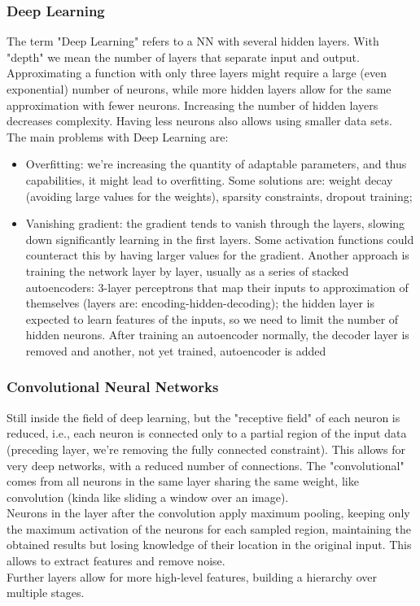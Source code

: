 \subsubsection{Deep Learning}
The term "Deep Learning" refers to a NN with several hidden layers. With "depth" we mean the number of layers that separate input and output. \\
Approximating a function with only three layers might require a large (even exponential) number of neurons, while more hidden layers allow for the same approximation with fewer neurons. Increasing the number of hidden layers decreases complexity. Having less neurons also allows using smaller data sets.\\

The main problems with Deep Learning are: 
\begin{itemize}
	\item Overfitting: we're increasing the quantity of adaptable parameters, and thus capabilities, it might lead to overfitting. Some solutions are: weight decay (avoiding large values for the weights), sparsity constraints, dropout training; 
	\item Vanishing gradient: the gradient tends to vanish through the layers, slowing down significantly learning in the first layers. Some activation functions could counteract this by having larger values for the gradient. Another approach is training the network layer by layer, usually as a series of stacked autoencoders: 3-layer perceptrons that map their inputs to approximation of themselves (layers are: encoding-hidden-decoding); the hidden layer is expected to learn features of the inputs, so we need to limit the number of hidden neurons. After training an autoencoder normally, the decoder layer is removed and another, not yet trained, autoencoder is added
\end{itemize}

\subsubsection{Convolutional Neural Networks}
Still inside the field of deep learning, but the "receptive field" of each neuron is reduced, i.e., each neuron is connected only to a partial region of the input data (preceding layer, we're removing the fully connected constraint). This allows for very deep networks, with a reduced number of connections. The "convolutional" comes from all neurons in the same layer sharing the same weight, like convolution (kinda like sliding a window over an image).\\
Neurons in the layer after the convolution apply maximum pooling, keeping only the maximum activation of the neurons for each sampled region, maintaining the obtained results but losing knowledge of their location in the original input. This allows to extract features and remove noise. \\
Further layers allow for more high-level features, building a hierarchy over multiple stages.\\

